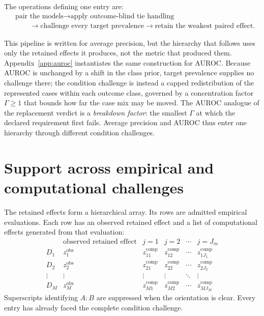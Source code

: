 \documentclass[11pt]{article}
\theoremstyle{remark}
\begin{document}
The operations defining one entry are:
\[
\begin{aligned}
&\text{pair the models}
\longrightarrow
\text{apply outcome-blind tie handling}\\
&\qquad\longrightarrow
\text{challenge every target prevalence}
\longrightarrow
\text{retain the weakest paired effect}.
\end{aligned}
\]

This pipeline is written for average precision, but the hierarchy that follows
uses only the retained effects it produces, not the metric that produced them.
Appendix~\ref{app:auroc} instantiates the same construction for AUROC. Because
AUROC is unchanged by a shift in the class prior, target prevalence supplies no
challenge there; the condition challenge is instead a capped redistribution of
the represented cases within each outcome class, governed by a concentration
factor $\Gamma\geq1$ that bounds how far the case mix may be moved. The AUROC
analogue of the replacement verdict is a \emph{breakdown factor}: the smallest
$\Gamma$ at which the declared requirement first fails. Average precision and
AUROC thus enter one hierarchy through different condition challenges.

\section{Support across empirical and computational challenges}
\label{sec:hierarchy}

The retained effects form a hierarchical array. Its rows are admitted
empirical evaluations. Each row has an observed retained effect and a list of
computational effects generated from that evaluation:
\begin{equation}
\begin{array}{c|c|cccc}
&\text{observed retained effect}&j=1&j=2&\cdots&j=J_m\\
\hline
D_1&z_1^{\mathrm{obs}}&z_{11}^{\mathrm{comp}}&z_{12}^{\mathrm{comp}}&\cdots&z_{1J_1}^{\mathrm{comp}}\\
D_2&z_2^{\mathrm{obs}}&z_{21}^{\mathrm{comp}}&z_{22}^{\mathrm{comp}}&\cdots&z_{2J_2}^{\mathrm{comp}}\\
\vdots&\vdots&\vdots&\vdots&\ddots&\vdots\\
D_M&z_M^{\mathrm{obs}}&z_{M1}^{\mathrm{comp}}&z_{M2}^{\mathrm{comp}}&\cdots&z_{MJ_M}^{\mathrm{comp}}
\end{array}
\label{eq:effect-array}
\end{equation}
Superscripts identifying $A:B$ are suppressed when the orientation is clear.
Every entry has already faced the complete condition challenge.
\end{document}
